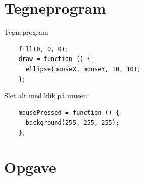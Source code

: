 \documentclass[oneside,a4paper,10pts,article]{memoir}
\begin{document}
\newpage
\chapter{Tegneprogram}

\noindent
Tegneprogram
\begin{lstlisting}
    fill(0, 0, 0);
    draw = function () {
      ellipse(mouseX, mouseY, 10, 10);
    };
\end{lstlisting}

\noindent
Slet alt med klik på musen:
\begin{lstlisting}
    mousePressed = function () {
      background(255, 255, 255);
    };
\end{lstlisting}

\chapter{Opgave}
\end{document}
